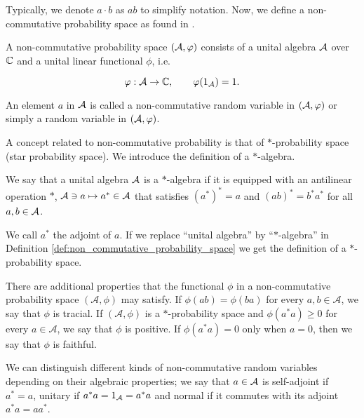 Typically, we denote \(a \cdot b\) as \(ab\) to simplify notation. Now, we define a non-commutative probability space as found in \cite{book:nica_speicher}.

\begin{definition} \label{def:non_commutative_probability_space}
    A non-commutative probability space $(\mathcal A,\varphi)$ consists of a unital algebra $\mathcal A$ over $\mathbb C$ and a unital linear functional $\phi$, i.e.

    \begin{equation*}
        \varphi : \mathcal A \to \mathbb C, \qquad \varphi(1_\mathcal A) = 1.
    \end{equation*}
\end{definition}

    An element $a$ in $\mathcal A$ is called a non-commutative random variable in $(\mathcal A, \varphi)$ or simply a random variable in $(\mathcal A,\varphi)$.

    A concept related to non-commutative probability is that of $*$-probability space (star probability space). We introduce the definition of a $*$-algebra.

    \begin{definition}[$*$-Algebra]
        We say that a unital algebra $\mathcal A$ is a $*$-algebra if it is equipped with an antilinear operation $*$, $\mathcal A \ni a \mapsto a^* \in \mathcal A$ that satisfies $(a^*)^* = a$ and $(ab)^* = b^* a^*$ for all $a,b \in \mathcal A$.
    \end{definition}

    We call $a^*$ the adjoint of $a$. If we replace ``unital algebra'' by ``$*$-algebra'' in Definition \ref{def:non_commutative_probability_space} we get the definition of a $*$-probability space.


    There are additional properties that the functional \(\phi\) in a non-commutative probability space \((\mathcal{A}, \phi)\) may satisfy. If \(\phi(ab) = \phi(ba)\) for every \(a, b \in \mathcal{A}\), we say that \(\phi\) is tracial. If \((\mathcal{A}, \phi)\) is a \(*\)-probability space and \(\phi(a^*a) \geq 0\) for every \(a \in \mathcal{A}\), we say that \(\phi\) is positive. If \(\phi(a^*a) = 0\) only when \(a = 0\), then we say that \(\phi\) is faithful.

    We can distinguish different kinds of non-commutative random variables depending on their algebraic properties; we say that $a \in \mathcal A$ is self-adjoint if $a^* = a$, unitary if $a^*a = 1_\mathcal A = a^*a$ and normal if it commutes with its adjoint $a^*a = aa^*$.

